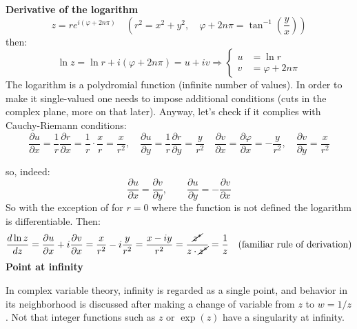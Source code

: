 \documentclass{article}
\begin{document}
\vspace{2mm} \noindent
\textbf{Derivative of the logarithm}
\begin{equation}
    z = r e^{i(\varphi + 2n\pi)}
\quad \left(
r^2 = x^2 + y^2, \quad
\varphi + 2n\pi = \tan^{-1} \left( \frac{y}{x} \right)
\right)
\end{equation}
then:
\begin{equation}
    \ln z = \ln r + i(\varphi + 2n\pi) = u + iv
\Rightarrow
\left\{
\begin{aligned}
u &= \ln r \\
v &= \varphi + 2n\pi
\end{aligned}
\right.
\end{equation}
The logarithm is a polydromial function (infinite number of values). In order to make it single-valued one needs to impose additional conditions (cuts in the complex plane, more on that later). Anyway, let’s check if it complies with Cauchy-Riemann conditions:
\begin{equation}
    \frac{\partial u}{\partial x}
= \frac{1}{r} \frac{\partial r}{\partial x}
= \frac{1}{r} \cdot \frac{x}{r}
= \frac{x}{r^2}, \quad
\frac{\partial u}{\partial y}
= \frac{1}{r} \frac{\partial r}{\partial y}
= \frac{y}{r^2} \quad \frac{\partial v}{\partial x} = \frac{\partial \varphi}{\partial x} = -\frac{y}{r^2},
\quad
\frac{\partial v}{\partial y} = \frac{x}{r^2}
\end{equation}

\newpage
\noindent
so, indeed:
\begin{equation}
    \frac{\partial u}{\partial x} = \frac{\partial v}{\partial y},
\qquad
\frac{\partial u}{\partial y} = -\frac{\partial v}{\partial x}
\end{equation}
So with the exception of for $r=0$ where the function is not defined the logarithm is differentiable. Then:
\begin{equation}
    \frac{d \ln z}{d z}
= \frac{\partial u}{\partial x} + i \frac{\partial v}{\partial x}
= \frac{x}{r^2} - i \frac{y}{r^2}
= \frac{x - i y}{r^2}
= \frac{\cancel{z^*}}{z \cdot \cancel{z^*}}
= \frac{1}{z} \quad \text{(familiar rule of derivation)}
\end{equation} 
\textbf{Point at infinity}

\noindent
In complex variable theory, infinity is regarded as a single point, and behavior in its neighborhood is discussed after making a change of variable from $z$ to $w=1/z$. Not that integer functions such as $z$ or $\exp(z)$ have a singularity at infinity.
\end{document}
